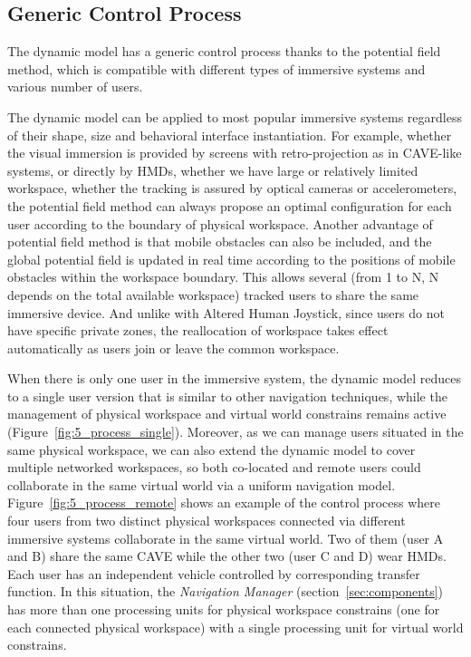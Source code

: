 \subsection{Generic Control Process}

The dynamic model has a generic control process thanks to the potential field method, which is compatible with different types of immersive systems and various number of users.

The dynamic model can be applied to most popular immersive systems regardless of their shape, size and behavioral interface instantiation. For example, whether the visual immersion is provided by screens with retro-projection as in CAVE-like systems, or directly by HMDs, whether we have large or relatively limited workspace, whether the tracking is assured by optical cameras or accelerometers, the potential field method can always propose an optimal configuration for each user according to the boundary of physical workspace. Another advantage of potential field method is that mobile obstacles can also be included, and the global potential field is updated in real time according to the positions of mobile obstacles within the workspace boundary. This allows several (from 1 to N, N depends on the total available workspace) tracked users to share the same immersive device. And unlike with Altered Human Joystick, since users do not have specific private zones, the reallocation of workspace takes effect automatically as users join or leave the common workspace. 

When there is only one user in the immersive system, the dynamic model reduces to a single user version that is similar to other navigation techniques, while the management of physical workspace and virtual world constrains remains active (Figure~\ref{fig:5_process_single}). Moreover, as we can manage users situated in the same physical workspace, we can also extend the dynamic model to cover multiple networked workspaces, so both co-located and remote users could collaborate in the same virtual world via a uniform navigation model. Figure~\ref{fig:5_process_remote} shows an example of the control process where four users from two distinct physical workspaces connected via different immersive systems collaborate in the same virtual world. Two of them (user A and B) share the same CAVE while the other two (user C and D) wear HMDs. Each user has an independent vehicle controlled by corresponding transfer function. In this situation, the \textit{Navigation Manager} (section~\ref{sec:components}) has more than one processing units for physical workspace constrains (one for each connected physical workspace) with a single processing unit for virtual world constrains.   

